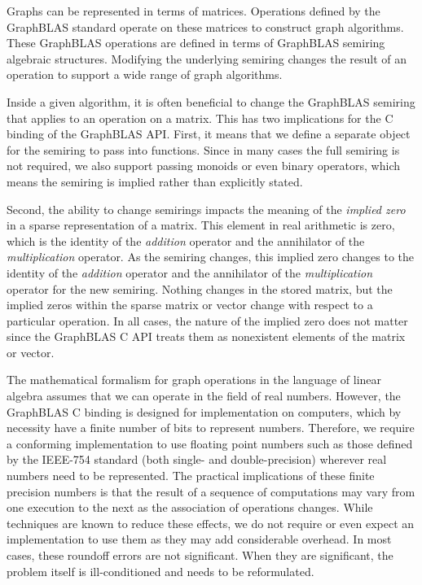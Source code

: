 Graphs can be represented in terms of matrices. Operations defined by the GraphBLAS standard
operate on these matrices to construct graph algorithms.
These GraphBLAS operations are defined in terms of GraphBLAS semiring algebraic 
structures. Modifying the underlying semiring changes the result of 
an operation to support a wide range of graph algorithms.

Inside a given algorithm, it is often beneficial to change the GraphBLAS semiring
that applies to an operation on a matrix.  This has two 
implications for the C binding of the GraphBLAS API.  First,
it means that we define a separate object for the semiring 
to pass into functions.  Since in many cases the full
semiring is not required, we also support passing monoids or
even binary operators, which means the semiring is implied rather than 
explicitly stated.

Second, the ability to change semirings impacts the meaning of 
the \emph{implied zero} in a sparse representation of a matrix.
This element in real arithmetic is zero, which is the 
identity of the \emph{addition} operator and the annihilator of the
\emph{multiplication} operator.  As the semiring changes, this 
implied zero changes to the identity of 
the \emph{addition} operator and the annihilator of the \emph{multiplication} 
operator for the new semiring. Nothing changes in the stored matrix, but the 
implied zeros within the sparse matrix or vector change with respect to a particular operation. In all cases, 
the nature of the implied zero does not matter since the GraphBLAS C API treats them as nonexistent elements of the matrix or vector.


The mathematical formalism for graph operations in the language of 
linear algebra assumes that we can operate in the field of real numbers. 
However, the GraphBLAS C binding is designed for implementation on computers, 
which by necessity have a finite number of bits to represent numbers. 
Therefore, we require a conforming implementation to use floating point 
numbers such as those defined by the IEEE-754 standard (both single- and double-precision) 
wherever real numbers need to be represented. The practical implications of 
these finite precision numbers is that the result of a sequence of 
computations may vary from one execution to the next as the association 
of operations changes.  While techniques are known to 
reduce these effects, we do not require or even expect an implementation 
to use them as they may add considerable overhead. In most 
cases, these roundoff errors are not significant. When they are significant, 
the problem itself is ill-conditioned and needs to be reformulated.

